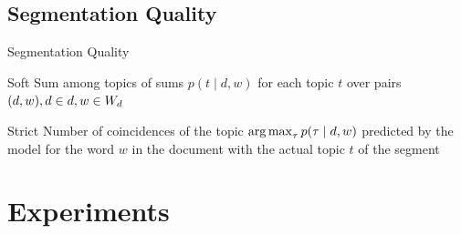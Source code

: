 \documentclass[russian]{beamer}
\begin{document}
	
\subsection{Segmentation Quality}

\begin{frame}{Segmentation Quality}
  \begin{block}{Soft}
    Sum among topics of sums $p(t \mid d, w)$ for each topic $t$ over pairs $(d, w), d \hm\in d, w \hm\in W_d$
  \end{block}
  
  \begin{block}{Strict}
    Number of coincidences of the topic $\operatorname*{arg\,max}_\tau p(\tau \mid d, w)$ predicted by the model for the word $w$ in the document with the actual topic $t$ of the segment
  \end{block}
\end{frame}


\section{Experiments}
\end{document}
